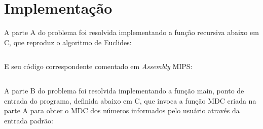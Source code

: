 \chapter{Implementação}

A parte A do problema foi resolvida implementando a função recursiva abaixo em C, que reproduz o algoritmo de Euclides:\\

\inputminted[frame=lines, framesep=2mm, baselinestretch=1.2, linenos, tabsize=4, 
fontsize=\small]{c}{./documentos/euclides.c} 

\newpage
E seu código correspondente comentado em \textit{Assembly} MIPS:\\


\inputminted[frame=lines, framesep=2mm, baselinestretch=1.2, linenos, tabsize=4, breaklines,
fontsize=\small]{asm}{./documentos/euclides.asm}

    A parte B do problema foi resolvida implementando a função main, ponto de entrada do programa, definida abaixo em C, que invoca a função MDC criada na parte A para obter o MDC dos números informados pelo usuário através da entrada padrão:
